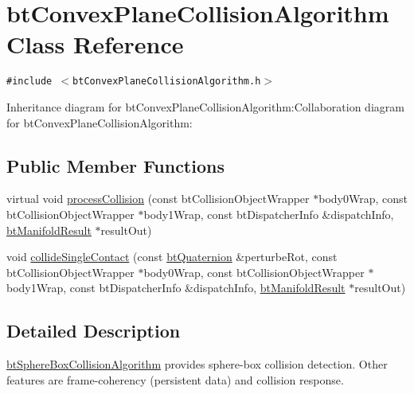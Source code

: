 \hypertarget{classbt_convex_plane_collision_algorithm}{
\section{btConvexPlaneCollisionAlgorithm Class Reference}
\label{classbt_convex_plane_collision_algorithm}
}
{\tt \#include $<$btConvexPlaneCollisionAlgorithm.h$>$}

Inheritance diagram for btConvexPlaneCollisionAlgorithm:Collaboration diagram for btConvexPlaneCollisionAlgorithm:\subsection*{Public Member Functions}
\begin{CompactItemize}
\item 
virtual void \hyperlink{classbt_convex_plane_collision_algorithm_ce95b966a346d00f7666549220f6afb8}{processCollision} (const btCollisionObjectWrapper $\ast$body0Wrap, const btCollisionObjectWrapper $\ast$body1Wrap, const btDispatcherInfo \&dispatchInfo, \hyperlink{classbt_manifold_result}{btManifoldResult} $\ast$resultOut)
\item 
void \hyperlink{classbt_convex_plane_collision_algorithm_79f8384fcdc2145be9fca0057edc8b69}{collideSingleContact} (const \hyperlink{classbt_quaternion}{btQuaternion} \&perturbeRot, const btCollisionObjectWrapper $\ast$body0Wrap, const btCollisionObjectWrapper $\ast$body1Wrap, const btDispatcherInfo \&dispatchInfo, \hyperlink{classbt_manifold_result}{btManifoldResult} $\ast$resultOut)
\end{CompactItemize}


\subsection{Detailed Description}
\hyperlink{classbt_sphere_box_collision_algorithm}{btSphereBoxCollisionAlgorithm} provides sphere-box collision detection. Other features are frame-coherency (persistent data) and collision response. 

